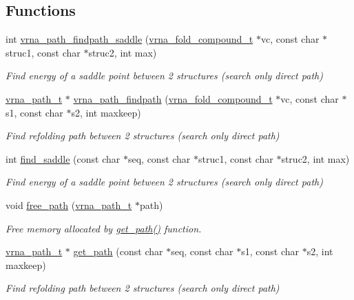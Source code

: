 \subsection*{Functions}
\begin{DoxyCompactItemize}
\item 
int \hyperlink{group__direct__paths_ga957922acc1bcaa97f52cbd0975f7dcd0}{vrna\+\_\+path\+\_\+findpath\+\_\+saddle} (\hyperlink{group__fold__compound_ga1b0cef17fd40466cef5968eaeeff6166}{vrna\+\_\+fold\+\_\+compound\+\_\+t} $\ast$vc, const char $\ast$struc1, const char $\ast$struc2, int max)
\begin{DoxyCompactList}\small\item\em Find energy of a saddle point between 2 structures (search only direct path) \end{DoxyCompactList}\item 
\hyperlink{group__direct__paths_ga818d4f3d1cf8723d6905990b08d909fe}{vrna\+\_\+path\+\_\+t} $\ast$ \hyperlink{group__direct__paths_ga5e1f97f58adc65016a8df88802dc16b5}{vrna\+\_\+path\+\_\+findpath} (\hyperlink{group__fold__compound_ga1b0cef17fd40466cef5968eaeeff6166}{vrna\+\_\+fold\+\_\+compound\+\_\+t} $\ast$vc, const char $\ast$s1, const char $\ast$s2, int maxkeep)
\begin{DoxyCompactList}\small\item\em Find refolding path between 2 structures (search only direct path) \end{DoxyCompactList}\item 
int \hyperlink{group__direct__paths_gad0e14268e309af773ecd1fce6244ee50}{find\+\_\+saddle} (const char $\ast$seq, const char $\ast$struc1, const char $\ast$struc2, int max)
\begin{DoxyCompactList}\small\item\em Find energy of a saddle point between 2 structures (search only direct path) \end{DoxyCompactList}\item 
void \hyperlink{group__direct__paths_ga9056421d716ae89f0ed3f107627f395b}{free\+\_\+path} (\hyperlink{group__direct__paths_ga818d4f3d1cf8723d6905990b08d909fe}{vrna\+\_\+path\+\_\+t} $\ast$path)
\begin{DoxyCompactList}\small\item\em Free memory allocated by \hyperlink{group__direct__paths_ga0b22426253e190bd268f86b01b71220d}{get\+\_\+path()} function. \end{DoxyCompactList}\item 
\hyperlink{group__direct__paths_ga818d4f3d1cf8723d6905990b08d909fe}{vrna\+\_\+path\+\_\+t} $\ast$ \hyperlink{group__direct__paths_ga0b22426253e190bd268f86b01b71220d}{get\+\_\+path} (const char $\ast$seq, const char $\ast$s1, const char $\ast$s2, int maxkeep)
\begin{DoxyCompactList}\small\item\em Find refolding path between 2 structures (search only direct path) \end{DoxyCompactList}\end{DoxyCompactItemize}


